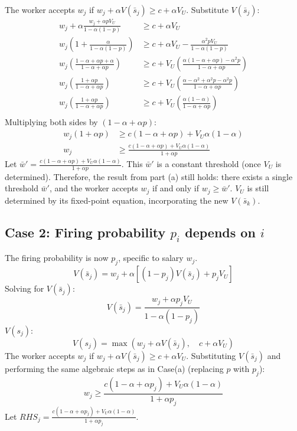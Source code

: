 \documentclass[11pt, a4paper, oneside]{memoir}
\begin{document}
The worker accepts $w_j$ if $w_j + \alpha V(\bar{s}_j) \ge c + \alpha V_U$.
Substitute $V(\bar{s}_j)$:
\begin{align*}
  w_j + \alpha \frac{w_j + \alpha p V_U}{1 - \alpha(1-p)}                       & \ge c + \alpha V_U                                                                                 \\
  w_j \left(1 + \frac{\alpha}{1 - \alpha(1-p)}\right)                           & \ge c + \alpha V_U - \frac{\alpha^2 p V_U}{1 - \alpha(1-p)}                                        \\
  w_j \left(\frac{1 - \alpha + \alpha p + \alpha}{1 - \alpha + \alpha p}\right) & \ge c + V_U \left(\frac{\alpha(1 - \alpha + \alpha p) - \alpha^2 p}{1 - \alpha + \alpha p}\right)  \\
  w_j \left(\frac{1 + \alpha p}{1 - \alpha + \alpha p}\right)                   & \ge c + V_U \left(\frac{\alpha - \alpha^2 + \alpha^2 p - \alpha^2 p}{1 - \alpha + \alpha p}\right) \\
  w_j \left(\frac{1 + \alpha p}{1 - \alpha + \alpha p}\right)                   & \ge c + V_U \left(\frac{\alpha(1 - \alpha)}{1 - \alpha + \alpha p}\right)                          \\
\end{align*}
Multiplying both sides by $(1 - \alpha + \alpha p)$:
\begin{align*}
  w_j (1 + \alpha p) & \ge c(1 - \alpha + \alpha p) + V_U \alpha(1 - \alpha)                      \\
  w_j                & \ge \frac{c(1 - \alpha + \alpha p) + V_U \alpha(1 - \alpha)}{1 + \alpha p}
\end{align*}
Let $\bar{w}' = \frac{c(1 - \alpha + \alpha p) + V_U \alpha(1 - \alpha)}{1 + \alpha p}$.
This $\bar{w}'$ is a constant threshold (once $V_U$ is determined).
Therefore, the result from part (a) still holds: there exists a single threshold $\bar{w}'$,
and the worker accepts $w_j$ if and only if $w_j \ge \bar{w}'$. $V_U$ is still determined by its fixed-point equation,
incorporating the new $V(\bar{s}_k)$.

\subsection*{Case 2: Firing probability $p_i$ depends on $i$}
The firing probability is now $p_j$, specific to salary $w_j$.
\[ V(\bar{s}_j) = w_j + \alpha \left[ (1-p_j)V(\bar{s}_j) + p_j V_U \right] \]
Solving for $V(\bar{s}_j)$:
\[ V(\bar{s}_j) = \frac{w_j + \alpha p_j V_U}{1 - \alpha(1-p_j)} \]
$V(s_j)$:
\[ V(s_j) = \max \left( w_j + \alpha V(\bar{s}_j), \quad c + \alpha V_U \right) \]
The worker accepts $w_j$ if $w_j + \alpha V(\bar{s}_j) \ge c + \alpha V_U$.
Substituting $V(\bar{s}_j)$ and performing the same algebraic steps as in Case(a) (replacing $p$ with $p_j$):
\[ w_j \ge \frac{c(1 - \alpha + \alpha p_j) + V_U \alpha(1 - \alpha)}{1 + \alpha p_j} \]
Let $RHS_j = \frac{c(1 - \alpha + \alpha p_j) + V_U \alpha(1 - \alpha)}{1 + \alpha p_j}$.
\end{document}
